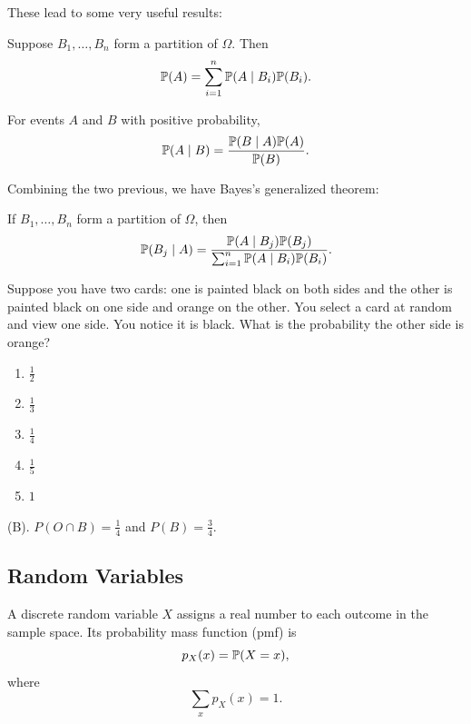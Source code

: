 These lead to some very useful results:

\begin{theorem}
Suppose $B_1,\ldots,B_n$ form a partition of $\Omega$. Then
\[
\mathbb{P}(A)
=
\sum_{i=1}^n
\mathbb{P}(A\mid B_i)\mathbb{P}(B_i).
\]
\end{theorem}

\begin{theorem}
For events $A$ and $B$ with positive probability,
\[
\mathbb{P}(A\mid B)
=
\frac{\mathbb{P}(B\mid A)\mathbb{P}(A)}
{\mathbb{P}(B)}.
\]
\end{theorem}

Combining the two previous, we have Bayes's generalized theorem:

\begin{theorem}
If $B_1,\ldots,B_n$ form a partition of $\Omega$, then
\[
\mathbb{P}(B_j\mid A)
=
\frac{\mathbb{P}(A\mid B_j)\mathbb{P}(B_j)}
{\sum_{i=1}^n \mathbb{P}(A\mid B_i)\mathbb{P}(B_i)}.
\]
\end{theorem}

\begin{exercise}
Suppose you have two cards: one is painted black on both sides and the other 
is painted black on one side and orange on the other. You select a card at 
random and view one side. You notice it is black. What is the probability 
the other side is orange?
\begin{enumerate}[label=(\Alph*)]
    \item $\frac{1}{2}$
    \item $\frac{1}{3}$
    \item $\frac{1}{4}$
    \item $\frac{1}{5}$
    \item $1$
\end{enumerate}
\end{exercise}
\begin{solution}
(B). $P(O \cap B) = \frac{1}{4}$ and $P(B) = \frac{3}{4}$.
\end{solution}

\subsection{Random Variables}

\begin{df}
A discrete random variable $X$ assigns a real number to each outcome in the
sample space. Its probability mass function (pmf) is
\[
p_X(x)=\mathbb{P}(X=x),
\]
where
\[
\sum_x p_X(x)=1.
\]
\end{df}

